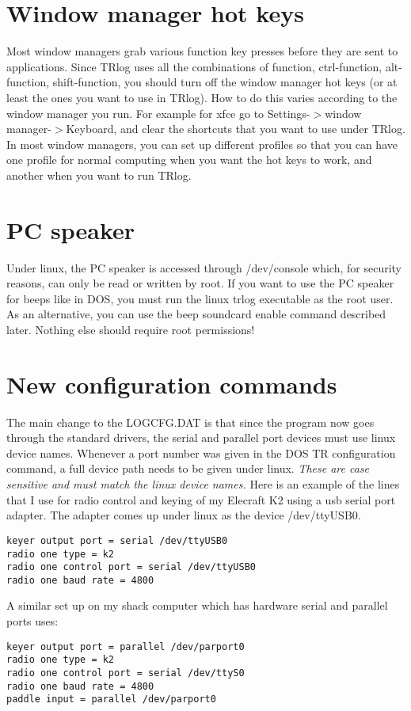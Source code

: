 \documentclass[12pt]{article}
\begin{document}
\section{Window manager hot keys}
Most window managers grab various function key presses before they
are sent to applications. Since TRlog uses all the combinations of
function, ctrl-function, alt-function, shift-function, you should turn
off the window manager hot keys (or at least the ones you want to use
in TRlog). How to do this varies according to the window manager you run.
For example for xfce go to Settings-$>$window manager-$>$Keyboard, and clear
the shortcuts that you want to use under TRlog. In most window managers,
you can set up different profiles so that you can have one profile for
normal computing when you want the hot keys to work, and another when you
want to run TRlog.

\section{PC speaker}
Under linux, the PC speaker is accessed through /dev/console which, for
security reasons, can only be read or written by root. If you
want to use the PC speaker for beeps like in DOS, you must run the linux trlog 
executable as the root user.
As an alternative, you can use the beep soundcard enable command described
later. Nothing else should require root permissions!

\section{New configuration commands}
The main change to the LOGCFG.DAT is that since the program now goes through
the standard drivers, the serial and parallel port devices must use linux
device names. Whenever a port number was given in the DOS TR configuration
command, a full device path needs to be given under linux. {\em These
are case sensitive and must match the linux device names.}
Here is an example of the lines that I use for radio control and keying
of my Elecraft K2 using a usb serial port adapter. The adapter comes
up under linux as the device /dev/ttyUSB0.
\begin{verbatim}
keyer output port = serial /dev/ttyUSB0
radio one type = k2
radio one control port = serial /dev/ttyUSB0
radio one baud rate = 4800
\end{verbatim}

A similar set up on my shack computer which has hardware
serial and parallel ports uses:
\begin{verbatim}
keyer output port = parallel /dev/parport0
radio one type = k2
radio one control port = serial /dev/ttyS0
radio one baud rate = 4800
paddle input = parallel /dev/parport0
\end{verbatim}
\end{document}
